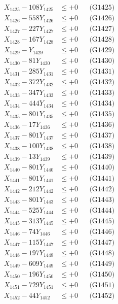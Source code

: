 \documentclass[a4paper,10pt]{article}
\begin{document}
{\begin{align}
X_{1425} - 108Y_{1425} &\leq +0 && \text{(G1425)} \\
X_{1426} - 558Y_{1426} &\leq +0 && \text{(G1426)} \\
X_{1427} - 227Y_{1427} &\leq +0 && \text{(G1427)} \\
X_{1428} - 167Y_{1428} &\leq +0 && \text{(G1428)} \\
X_{1429} - Y_{1429} &\leq +0 && \text{(G1429)} \\
X_{1430} - 81Y_{1430} &\leq +0 && \text{(G1430)} \\
\allowbreak
X_{1431} - 285Y_{1431} &\leq +0 && \text{(G1431)} \\
X_{1432} - 372Y_{1432} &\leq +0 && \text{(G1432)} \\
X_{1433} - 347Y_{1433} &\leq +0 && \text{(G1433)} \\
X_{1434} - 444Y_{1434} &\leq +0 && \text{(G1434)} \\
X_{1435} - 801Y_{1435} &\leq +0 && \text{(G1435)} \\
X_{1436} - 17Y_{1436} &\leq +0 && \text{(G1436)} \\
X_{1437} - 801Y_{1437} &\leq +0 && \text{(G1437)} \\
X_{1438} - 100Y_{1438} &\leq +0 && \text{(G1438)} \\
X_{1439} - 13Y_{1439} &\leq +0 && \text{(G1439)} \\
X_{1440} - 801Y_{1440} &\leq +0 && \text{(G1440)} \\
\allowbreak
X_{1441} - 801Y_{1441} &\leq +0 && \text{(G1441)} \\
X_{1442} - 212Y_{1442} &\leq +0 && \text{(G1442)} \\
X_{1443} - 801Y_{1443} &\leq +0 && \text{(G1443)} \\
X_{1444} - 525Y_{1444} &\leq +0 && \text{(G1444)} \\
X_{1445} - 313Y_{1445} &\leq +0 && \text{(G1445)} \\
X_{1446} - 74Y_{1446} &\leq +0 && \text{(G1446)} \\
X_{1447} - 115Y_{1447} &\leq +0 && \text{(G1447)} \\
X_{1448} - 197Y_{1448} &\leq +0 && \text{(G1448)} \\
X_{1449} - 609Y_{1449} &\leq +0 && \text{(G1449)} \\
X_{1450} - 196Y_{1450} &\leq +0 && \text{(G1450)} \\
\allowbreak
X_{1451} - 729Y_{1451} &\leq +0 && \text{(G1451)} \\
X_{1452} - 44Y_{1452} &\leq +0 && \text{(G1452)} \\

\end{align}}
\end{document}
